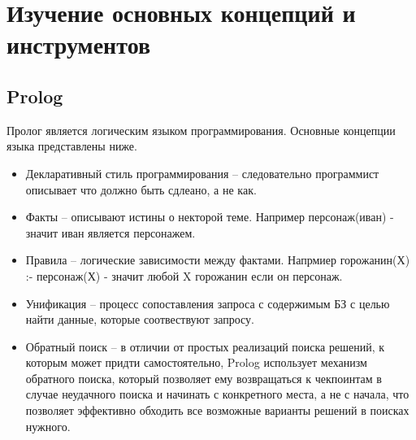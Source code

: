 \documentclass{article}
\begin{document}
\section{Изучение основных концепций и инструментов}
\subsection{Prolog}
Пролог является логическим языком программирования. Основные концепции языка представлены ниже. 
\begin{itemize}
\item Декларативный стиль программирования -- следовательно программист описывает что должно быть сдлеано, а не как.
\item Факты -- описывают истины о некторой теме. Например персонаж(иван) - значит иван является персонажем.
\item Правила -- логические зависимости между фактами. Напрмиер горожанин(Х) :- персонаж(Х) - значит любой X горожанин если он персонаж.
\item Унификация -- процесс сопоставления запроса с содержимым БЗ с целью найти данные, которые соотвествуют запросу. 
\item  Обратный поиск -- в отличии от простых реализаций поиска решений, к которым может придти самостоятельно, Prolog использует механизм обратного поиска, который позволяет ему возвращаться к чекпоинтам в случае неудачного поиска и начинать с конкретного места, а не с начала, что позволяет эффективно обходить все возможные варианты решений в поисках нужного.
\end{itemize}
\end{document}
